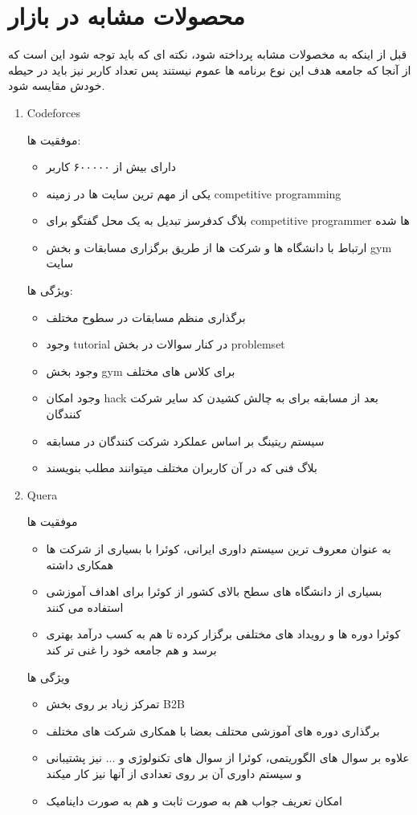 \documentclass{article}
\begin{document}
	\section{محصولات مشابه در بازار}
	قبل از اینکه به مخصولات مشابه پرداخته شود، نکته ای که باید توجه شود این است که از آنجا که جامعه هدف این نوع برنامه ها عموم نیستند پس تعداد کاربر نیز باید در حیطه خودش مقایسه شود. 
	\begin{enumerate}
		
		\item
		
		 Codeforces
		
		موفقیت ها:
		\begin{itemize}
			\item دارای بیش از ۶۰۰۰۰۰ کاربر
			\item یکی از مهم ترین سایت ها در زمینه competitive programming
			\item بلاگ کدفرسز تبدیل به یک محل گفتگو برای competitive programmer ها شده 
			\item ارتباط با دانشگاه ها و شرکت ها از طریق برگزاری مسابقات و بخش gym سایت
		\end{itemize}
		ویژگی ها:
		\begin{itemize}
			\item برگذاری منظم مسابقات در سطوح مختلف
			\item وجود tutorial در کنار سوالات در بخش problemset
			\item وجود بخش gym برای کلاس های مختلف
			\item وجود امکان hack بعد از مسابقه برای به چالش کشیدن کد سایر شرکت کنندگان
			\item سیستم ریتینگ بر اساس عملکرد شرکت کنندگان در مسابقه
			\item بلاگ فنی که در آن کاربران مختلف میتوانند مطلب بنویسند
		\end{itemize}
		
		\item 
		
		Quera
		
		موفقیت ها
		\begin{itemize}
			\item به عنوان معروف ترین سیستم داوری ایرانی، کوئرا با بسیاری از شرکت ها همکاری داشته 
			\item بسیاری از دانشگاه های سطح بالای کشور از کوئرا برای اهداف آموزشی استفاده می کنند 
			\item کوئرا دوره ها و رویداد های مختلفی برگزار کرده تا هم به کسب درآمد بهتری برسد و هم جامعه خود را غنی تر کند
		\end{itemize}
		
		ویژگی ها
		\begin{itemize}
			\item تمرکز زیاد بر روی بخش B2B
			\item برگذاری دوره های آموزشی محتلف بعضا با همکاری شرکت های مختلف
			\item  علاوه بر سوال های الگوریتمی، کوئرا از سوال های تکنولوژی و ... نیز پشتیبانی و سیستم داوری آن بر روی تعدادی از آنها نیز کار میکند
			\item امکان تعریف جواب هم به صورت ثابت و هم به صورت داینامیک
		\end{itemize}
	\end{enumerate}
	
\end{document}
